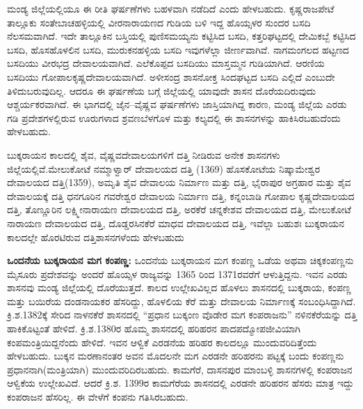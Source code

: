 \vskip 3pt

ಮಂಡ್ಯ ಜಿಲ್ಲೆಯಲ್ಲಿಯೂ ಈ ರೀತಿ ಘರ್ಷಣೆಗಳು ಬಹಳವಾಗಿ ನಡೆದಿದೆ ಎಂದು ಹೇಳಬಹುದು. ಕೃಷ್ಣರಾಜಪೇಟೆ ತಾಲ್ಲೂಕು ಸಂತೇಬಾಚಹಳ್ಳಿಯಲ್ಲಿ ವೀರನಾರಾಯಣದ ಗುಡಿಯ ಬಳಿ ಇದ್ದ ಹೊಯ್ಸಳರ ಸುಂದರ ಬಸದಿ ನೆಲಸಮವಾಗಿದೆ. ಇದೇ ತಾಲ್ಲೂಕಿನ ಬಸ್ತಿಯಲ್ಲಿ ಪುಣಿಸಮಯ್ಯನು ಕಟ್ಟಿಸಿದ ಬಸದಿ, ಕತ್ತರಿಘಟ್ಟದಲ್ಲಿ ದೇಮಿಕಬ್ಬೆ ಕಟ್ಟಿಸಿದ ಬಸದಿ, ಹೊಸಹೊಳಲಿನ ಬಸದಿ, ಮುರುಕನಹಳ್ಳಿಯ ಬಸದಿ ಇವುಗಳೆಲ್ಲಾ ಜೀರ್ಣವಾಗಿವೆ. ನಾಗಮಂಗಲದ ಹಟ್ಟಣದ ಬಸದಿಯು ವೀರಭದ್ರ ದೇವಾಲಯವಾಗಿದೆ. ಎಲೆಕೊಪ್ಪದ ಬಸದಿಯು ಮಾಸ್ತಮ್ಮನ ಗುಡಿಯಾಗಿದೆ. ಆರಣಿಯ ಬಸದಿಯು ಗೋಪಾಲಕೃಷ್ಣದೇವಾ\-ಲಯವಾಗಿದೆ. ಅಳೀಸಂದ್ರ ಶಾಸನೋಕ್ತ ಸಿಂದಘಟ್ಟದ ಬಸದಿ ಎಲ್ಲಿದೆ ಎಂಬುದೇ ತಿಳಿದುಬರುವುದಿಲ್ಲ. ಆದರೂ ಈ ಘರ್ಷಣೆಯ ಬಗ್ಗೆ ಜಿಲ್ಲೆಯಲ್ಲಿ ಯಾವುದೇ ಶಾಸನ ದೊರೆಯದಿರುವುದು ಆಶ್ಚರ್ಯಕರವಾಗಿದೆ. ಈ ಭಾಗದಲ್ಲಿ ಜೈನ–ವೈಷ್ಣವ ಘರ್ಷಣೆಗಳು ಜಾಸ್ತಿಯಾಗಿದ್ದ ಕಾರಣ, ಮಂಡ್ಯ ಜಿಲ್ಲೆಯ ಎರಡು ಗಡಿ ಪ್ರದೇಶಗಳಲ್ಲಿರುವ ಊರುಗಳಾದ ಶ್ರವಣಬೆಳಗೊಳ ಮತ್ತು ಕಲ್ಯದಲ್ಲಿ ಈ ಶಾಸನಗಳನ್ನು ಹಾಕಿಸಿರಬಹುದೆಂದು ಹೇಳಬಹುದು.

ಬುಕ್ಕರಾಯನ ಕಾಲದಲ್ಲಿ ಶೈವ, ವೈಷ್ಣವದೇವಾಲಯಗಳಿಗೆ ದತ್ತಿ ನೀಡಿರುವ ಅನೇಕ ಶಾಸನಗಳು ಜಿಲ್ಲೆಯಲ್ಲಿವೆ.\break ಮೇಲುಕೋಟೆ ನಮ್ಮಾಳ್ವಾರ್​ ದೇವಾಲಯದ ದತ್ತಿ (1369) ಹೊಸಕೋಟೆಯ ನಿಷ್ಕಾಮೇಶ್ವರ ದೇವಾಲಯದ ದತ್ತಿ(1359), ಅಮೃತಿ ಶೈವ ದೇವಾಲಯ ನಿರ್ಮಾಣ ಮತ್ತು ದತ್ತಿ, ಭೈರಾಪುರ ಅಗ್ರಹಾರ ಮತ್ತು ಶೈವ ದೇವಾಲಯಕ್ಕೆ ದತ್ತಿ ಧನಗೂರಿನ ಗವರೇಶ್ವರ ದೇವಾಲಯ ನಿರ್ಮಾಣ ದತ್ತಿ, ಕನ್ನಂಬಾಡಿ ಗೋಪಾಲ ಕೃಷ್ಣದೇವಾಲಯದ ದತ್ತಿ, ತೊಣ್ಣೂರಿನ ಲಕ್ಷ್ಮೀನಾರಾಯಣ ದೇವಾಲಯದ ದತ್ತಿ, ಅರಕೆರೆ ಚನ್ನಕೇಶವ ದೇವಾಲಯದ ದತ್ತಿ, ಮೇಲುಕೋಟೆ ನಾರಾಯಣ ದೇವಾಲಯದ ದತ್ತಿ, ದೊಡ್ಡರಸಿನಕೆರೆ ಮಾಧವ ದೇವಾಲಯದ ದತ್ತಿ, ಇವೆಲ್ಲಾ ಬಹುಶಃ ಬುಕ್ಕರಾಯನ ಕಾಲದಲ್ಲೇ ಹೊರಟಿರುವ ದತ್ತಿಶಾಸನಗಳೆಂದು ಹೇಳಬಹುದು

\textbf{ ಒಂದನೆಯ ಬುಕ್ಕರಾಯನ ಮಗ ಕಂಪಣ್ಣ:} ಒಂದನೆಯ ಬುಕ್ಕರಾಯನ ಮಗ ಕಂಪಣ್ಣ ಒಡೆಯ ಅಥವಾ ಚಿಕ್ಕಕಂಪಣ್ಣನು ಮೈಸೂರು ಪ್ರದೇಶವನ್ನು ಅಂದರೆ ಹೊಯ್ಸಳ ರಾಜ್ಯವನ್ನು 1365 ರಿಂದ 1371ರವರೆಗೆ ಆಳುತ್ತಿದ್ದನು. ಇವನ ಎರಡು ಶಾಸನವು ಮಂಡ್ಯ ಜಿಲ್ಲೆಯಲ್ಲಿ ದೊರೆಯುತ್ತದೆ. ಕಾಲದ ಉಲ್ಲೇಖವಿಲ್ಲದ ಹೊಳಲು ಶಾಸನದಲ್ಲಿ ಬುಕ್ಕರಾಯ, ಕಂಪಣ್ಣ ಮತ್ತು ಬಯಿರೆಯ ದಂಡನಾಯಕರ ಹೆಸರಿದ್ದು, ಹೊಳಲಿಯ ಕೆರೆ ಮತ್ತು ದೇವಾಲಯ ನಿರ್ಮಾಣಕ್ಕೆ ಸಂಬಂಧಿಸಿದ್ದಾಗಿದೆ. ಕ್ರಿ.ಶ.1382ಕ್ಕೆ ಸೇರಿದ ನಾಳನಕೆರೆ ಶಾಸನದಲ್ಲಿ “ಪ್ರಧಾನ ಬುಕ್ಕಂಣ ವೊಡೇರ ಮಗ ಕಂಪರಾಜನು” ನಳಿನಕೆರೆಯನ್ನು ದತ್ತಿ ಹಾಕಿಕೊಟ್ಟಂತೆ ಹೇಳಿದೆ. ಕ್ರಿ.ಶ.1380ರ ಹೊಮ್ಮ ಶಾಸನದಲ್ಲಿ ಹರಿಹರನ ಪಾದಪದ್ಮೋಪಜೀವಿಯಾಗಿ ಕಂಪಮಂತ್ರಿಯಿದ್ದನೆಂದು ಹೇಳಿದೆ. ಇವನ ಆಳ್ವಿಕೆ ಎರಡನೆಯ ಹರಿಹರ ಕಾಲದಲ್ಲೂ ಮುಂದುವರಿದಿತ್ತೆಂದು ಹೇಳಬಹುದು. ಬುಕ್ಕನ ಮರಣಾನಂತರ ಅವನ ಮೊದಲನೇ ಮಗ ಎರಡನೇ ಹರಿಹರನು ಪಟ್ಟಕ್ಕೆ ಬಂದು ಕಂಪಣ್ಣನು ಪ್ರಧಾನನಾಗಿ(ಮಂತ್ರಿಯಾಗಿ) ಮುಂದುವರಿದಿರಬಹುದು. ಕಾಮಗೆರೆ, ದಾಸನಪುರ ಮಾಂಬಳ್ಳಿ ಶಾಸನಗಳಲ್ಲಿ ಕಂಪರಾಜನ ಆಳ್ವಿಕೆಯ ಉಲ್ಲೇಖವಿದೆ. ಆದರೆ ಕ್ರಿ.ಶ. 1399ರ ಕಾಮಗೆರೆಯ ಶಾಸನದಲ್ಲಿ ಎರಡನೇ ಹರಿಹರನ ಹೆಸರು ಮಾತ್ರ ಇದ್ದು ಕಂಪರಾಜನ ಹೆಸರಿಲ್ಲ. ಈ ವೇಳೆಗೆ ಕಂಪನು ಗತಿಸಿರಬಹುದು.

